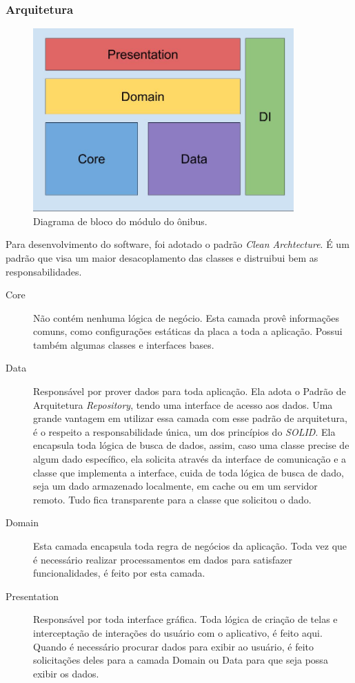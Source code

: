 \documentclass[
	12pt,				%
	oneside,			%
	a4paper,			%
	brazil				%
]{abntex2}
\begin{document}
\subsubsection{Arquitetura}

\begin{figure}[!h]
\centering
\includegraphics[width=10cm, center]{images/brick_diagram_bus_tracker}
\caption{Diagrama de bloco do módulo do ônibus.}
\label{Rotulo}
\end{figure}

Para desenvolvimento do software, foi adotado o padrão \textit{Clean Archtecture}. É um padrão que visa um maior desacoplamento das classes e distruibui bem as responsabilidades.

\begin{description}

\item[Core] Não contém nenhuma lógica de negócio. Esta camada provê informações comuns, como configurações estáticas da placa a toda a aplicação. Possui também algumas classes e interfaces bases.

\item[Data] Responsável por prover dados para toda aplicação. Ela adota o Padrão de Arquitetura \textit{Repository}, tendo uma interface de acesso aos dados. Uma grande vantagem em utilizar essa camada com esse padrão de arquitetura, é o respeito a responsabilidade única, um dos princípios do \textit{SOLID}. Ela encapsula toda lógica de busca de dados, assim, caso uma classe precise de algum dado específico, ela solicita através da interface de comunicação e a classe que implementa a interface, cuida de toda lógica de busca de dado, seja um dado armazenado localmente, em cache ou em um servidor remoto. Tudo fica transparente para a classe que solicitou o dado.

\item[Domain] Esta camada encapsula toda regra de negócios da aplicação. Toda vez que é necessário realizar processamentos em dados para satisfazer funcionalidades, é feito por esta camada.

\item[Presentation] Responsável por toda interface gráfica. Toda lógica de criação de telas e interceptação de interações do usuário com o aplicativo, é feito aqui. Quando é necessário procurar dados para exibir ao usuário, é feito solicitações deles para a camada Domain ou Data para que seja possa exibir os dados.
 
\end{description}
\end{document}
